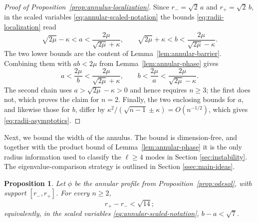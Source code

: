 \documentclass[11pt]{article}
\numberwithin{equation}{section}
\newtheorem{proposition}[theorem]{Proposition}
\theoremstyle{definition}
\begin{document}
\begin{proof}[Proof of Proposition~\ref{prop:annulus-localization}]
Since $r_-=\sqrt2\,a$ and $r_+=\sqrt2\,b$, in the scaled variables \eqref{eq:annular-scaled-notation} the bounds \eqref{eq:radii-localization} read
\[
    \sqrt{2\mu}-\kappa<a<\frac{2\mu}{\sqrt{2\mu}+\kappa},
    \qquad
    \sqrt{2\mu}+\kappa<b<\frac{2\mu}{\sqrt{2\mu}-\kappa}.
\]
The two lower bounds are the content of Lemma~\ref{lem:annular-barrier}. Combining them with $ab<2\mu$ from Lemma~\ref{lem:annular-phase} gives
\[
    a<\frac{2\mu}b<\frac{2\mu}{\sqrt{2\mu}+\kappa},
    \qquad
    b<\frac{2\mu}a<\frac{2\mu}{\sqrt{2\mu}-\kappa}.
\]
The second chain uses $a>\sqrt{2\mu}-\kappa>0$ and hence requires $n\geq3$; the first does not, which proves the claim for $n=2$. 
Finally, the two enclosing bounds for $a$, and likewise those for $b$, differ by $\kappa^2/(\sqrt{n-1}\pm\kappa)=O(n^{-1/2})$, which gives \eqref{eq:radii-asymptotics}.

\end{proof}


Next, we bound the width of the annulus. The bound is dimension-free, and together with the product bound of Lemma~\ref{lem:annular-phase} it is the only radius information used to classify the $\ell\geq4$ modes in Section \ref{sec:instability}. The eigenvalue-comparison strategy is outlined in Section \ref{ssec:main-ideas}.

\begin{proposition}\label{prop:annulus-width}
Let $\phi$ be the annular profile from Proposition~\ref{prop:odesol}, with support $[r_-,r_+]$. For every $n\geq2$,
\[
    r_+-r_-<\sqrt{14};
\]
equivalently, in the scaled variables \eqref{eq:annular-scaled-notation}, $b-a<\sqrt7$.
\end{proposition}
\end{document}

